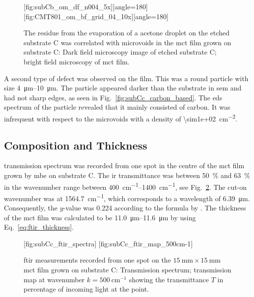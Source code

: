\begin{figure}[htbp]
    \centering
    [fig:subCb_om_df_n004_5x][angle=180]
    \hfill
    [fig:CMT801_om_bf_grid_04_10x][angle=180]
    \caption[Residue on etched substrate C visible as microvoids in the film.]{The residue from the evaporation of a acetone droplet on the etched substrate C was correlated with microvoids in the \ac{mct} film grown on substrate C:  Dark field microscopy image of etched substrate C;  bright field microscopy of \ac{mct} film.}\label{fig:subCc_microvoids_correlation}
\end{figure}

A second type of defect was observed on the film. This was a round particle with size \SIrange{4}{10}{\micro\metre}. The particle appeared darker than the substrate in \ac{sem} and had not sharp edges, as seen in Fig.~\ref{fig:subCc_carbon_based}. The \ac{eds} spectrum of the particle revealed that it mainly consisted of carbon. It was infrequent with respect to the microvoids with a density of \SI{\sim1e+02}{\centi\metre^{-2}}.

\subsection{Composition and Thickness}

 transmission spectrum was recorded from one spot in the centre of the \ac{mct} film grown by \ac{mbe} on substrate C. The \ac{ir} transmittance was between \SI{50}{\percent} and \SI{63}{\percent} in the wavenumber range between \SIrange{400}{1400}{\centi\metre^{-1}}, see Fig.~\ref{fig:subCc_ftir}. The cut-on wavenumber was at \SI{1564.7}{\centi\metre^{-1}}, which corresponds to a wavelength of \SI{6.39}{\micro\metre}. Consequently, the $y$-value was \SI{0.224}{} according to the formula by \citet{bricexxxxtttt}. The thickness of the \ac{mct} film was calculated to be \SIrange{11.0}{11.6}{\micro\metre} by using Eq.~\ref{eq:ftir_thickness}.


\begin{figure}[htbp]
    \centering
    [fig:subCc_ftir_spectra]
    \hfill
    [fig:subCc_ftir_map_500cm-1]
    \caption[\Ac{ftir} measurement from one spot on the \ac{mct} film grown on substrate C.]{\Ac{ftir} measurements recorded from one spot on the $\SI{15}{\milli\metre}\times\SI{15}{\milli\metre}$ \ac{mct} film grown on substrate C:  Transmission spectrum;  transmission map at wavenumber $k=\SI{500}{\centi\metre^{-1}}$ showing the transmittance $T$ in percentage of incoming light at the point.}\label{fig:subCc_ftir}
\end{figure}

